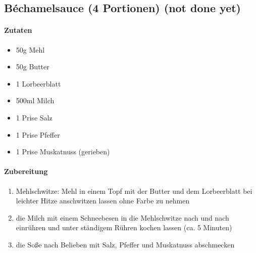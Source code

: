 \newpage
\subsection{Béchamelsauce (4 Portionen) (not done yet)}
\paragraph{Zutaten}
\begin{itemize}[noitemsep]
	\item 50g Mehl
	\item 50g Butter
	\item 1 Lorbeerblatt
	\item 500ml Milch
	\item 1 Prise Salz
	\item 1 Prise Pfeffer
	\item 1 Prise Muskatnuss (gerieben)
\end{itemize}
\paragraph{Zubereitung}
\begin{enumerate}[noitemsep]
	\item Mehlschwitze: Mehl in einem Topf mit der Butter und dem Lorbeerblatt bei leichter Hitze anschwitzen lassen ohne Farbe zu nehmen
	\item die Milch mit einem Schneebesen in die Mehlschwitze nach und nach einrühren und unter ständigem Rühren kochen lassen (ca. 5 Minuten)
	\item die Soße nach Belieben mit Salz, Pfeffer und Muskatnuss abschmecken
\end{enumerate}